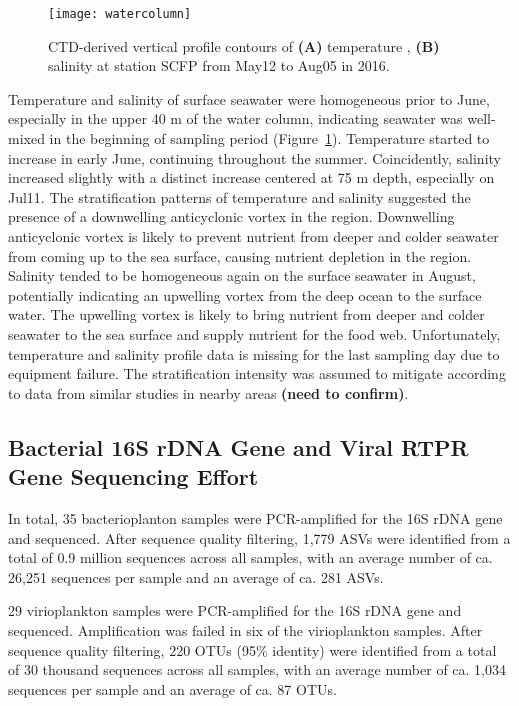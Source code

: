 \documentclass[a4,center,fleqn]{NAR}
\begin{document}
\begin{figure}[t]
\begin{center}
\texttt{[image: watercolumn]}
\end{center}
\caption{CTD-derived vertical profile contours of  \textbf{(A)} temperature , \textbf{(B)} salinity at station SCFP from May12 to Aug05 in 2016.
}
\label{watercolumn}
\end{figure}

Temperature and salinity of surface seawater were homogeneous prior to June, especially in the upper 40 m of the water column, indicating seawater was well-mixed in the beginning of sampling period (Figure~\ref{watercolumn}).
Temperature started to increase in early June, continuing throughout the summer. 
Coincidently, salinity increased slightly with a distinct increase centered at 75 m depth, especially on Jul11.  
The stratification patterns of temperature and salinity suggested the presence of a downwelling anticyclonic vortex in the region. 
Downwelling anticyclonic vortex is likely to prevent nutrient from deeper and colder seawater from coming up to the sea surface, causing nutrient depletion in the region.
Salinity tended to be homogeneous again on the surface seawater in August, potentially indicating an upwelling vortex from the deep ocean to the surface water.
The upwelling vortex is likely to bring nutrient from deeper and colder seawater to the sea surface and supply nutrient for the food web.
Unfortunately, temperature and salinity profile data is missing for the last sampling day due to equipment failure. 
The stratification intensity was assumed to mitigate according to data from similar studies in nearby areas \textbf{(need to confirm)}.

\subsection{Bacterial 16S rDNA Gene and Viral RTPR Gene Sequencing Effort}
In total, 35 bacterioplanton samples were PCR-amplified for the 16S rDNA gene and sequenced. 
After sequence quality filtering, 1,779 ASVs were identified from a total of 0.9 million sequences across all samples, with an average number of ca. 26,251 sequences per sample and an average of ca. 281 ASVs.

29 virioplankton samples were PCR-amplified for the 16S rDNA gene and sequenced.
Amplification was failed in six of the virioplankton samples.  
After sequence quality filtering, 220 OTUs (95\% identity) were identified from a total of 30 thousand sequences across all samples, with an average number of ca. 1,034 sequences per sample and an average of ca. 87 OTUs.
\end{document}
